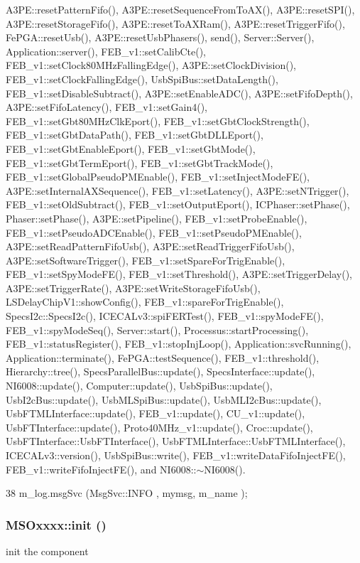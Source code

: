 A3PE::resetPatternFifo(), A3PE::resetSequenceFromToAX(), A3PE::resetSPI(), A3PE::resetStorageFifo(), A3PE::resetToAXRam(), A3PE::resetTriggerFifo(), FePGA::resetUsb(), A3PE::resetUsbPhasers(), send(), Server::Server(), Application::server(), FEB\_\-v1::setCalibCte(), FEB\_\-v1::setClock80MHzFallingEdge(), A3PE::setClockDivision(), FEB\_\-v1::setClockFallingEdge(), UsbSpiBus::setDataLength(), FEB\_\-v1::setDisableSubtract(), A3PE::setEnableADC(), A3PE::setFifoDepth(), A3PE::setFifoLatency(), FEB\_\-v1::setGain4(), FEB\_\-v1::setGbt80MHzClkEport(), FEB\_\-v1::setGbtClockStrength(), FEB\_\-v1::setGbtDataPath(), FEB\_\-v1::setGbtDLLEport(), FEB\_\-v1::setGbtEnableEport(), FEB\_\-v1::setGbtMode(), FEB\_\-v1::setGbtTermEport(), FEB\_\-v1::setGbtTrackMode(), FEB\_\-v1::setGlobalPseudoPMEnable(), FEB\_\-v1::setInjectModeFE(), A3PE::setInternalAXSequence(), FEB\_\-v1::setLatency(), A3PE::setNTrigger(), FEB\_\-v1::setOldSubtract(), FEB\_\-v1::setOutputEport(), ICPhaser::setPhase(), Phaser::setPhase(), A3PE::setPipeline(), FEB\_\-v1::setProbeEnable(), FEB\_\-v1::setPseudoADCEnable(), FEB\_\-v1::setPseudoPMEnable(), A3PE::setReadPatternFifoUsb(), A3PE::setReadTriggerFifoUsb(), A3PE::setSoftwareTrigger(), FEB\_\-v1::setSpareForTrigEnable(), FEB\_\-v1::setSpyModeFE(), FEB\_\-v1::setThreshold(), A3PE::setTriggerDelay(), A3PE::setTriggerRate(), A3PE::setWriteStorageFifoUsb(), LSDelayChipV1::showConfig(), FEB\_\-v1::spareForTrigEnable(), SpecsI2c::SpecsI2c(), ICECALv3::spiFERTest(), FEB\_\-v1::spyModeFE(), FEB\_\-v1::spyModeSeq(), Server::start(), Processus::startProcessing(), FEB\_\-v1::statusRegister(), FEB\_\-v1::stopInjLoop(), Application::svcRunning(), Application::terminate(), FePGA::testSequence(), FEB\_\-v1::threshold(), Hierarchy::tree(), SpecsParallelBus::update(), SpecsInterface::update(), NI6008::update(), Computer::update(), UsbSpiBus::update(), UsbI2cBus::update(), UsbMLSpiBus::update(), UsbMLI2cBus::update(), UsbFTMLInterface::update(), FEB\_\-v1::update(), CU\_\-v1::update(), UsbFTInterface::update(), Proto40MHz\_\-v1::update(), Croc::update(), UsbFTInterface::UsbFTInterface(), UsbFTMLInterface::UsbFTMLInterface(), ICECALv3::version(), UsbSpiBus::write(), FEB\_\-v1::writeDataFifoInjectFE(), FEB\_\-v1::writeFifoInjectFE(), and NI6008::$\sim$NI6008().


\begin{DoxyCode}
38 { m_log.msgSvc (MsgSvc::INFO    , mymsg, m_name ); }
\end{DoxyCode}
\hypertarget{classMSOxxxx_ac14ed16b221798423e7c3b5e285006b5}{
\subsubsection[{init}]{ MSOxxxx::init ()}}
\label{classMSOxxxx_ac14ed16b221798423e7c3b5e285006b5}
init the component

